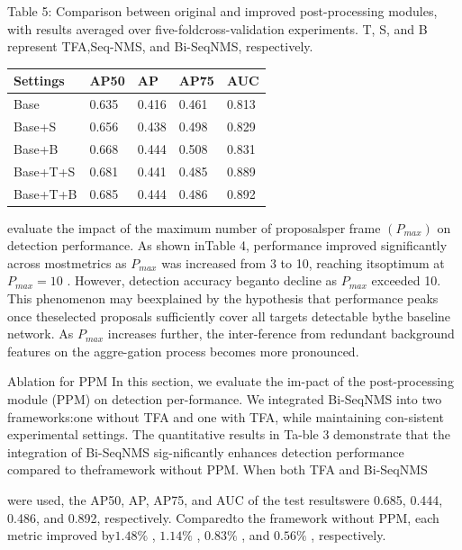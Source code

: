 \documentclass[
  10
]{article}
\newcounter{none} %
\begin{document}
Table 5: Comparison between original and improved post-processing
modules, with results averaged over five-foldcross-validation
experiments. T, S, and B represent TFA,Seq-NMS, and Bi-SeqNMS,
respectively.

{\def\LTcaptype{none} %
\begin{longtable}[]{@{}|l|l|l|l|l|@{}}
\toprule\noalign{}
\endhead
\bottomrule\noalign{}
\endlastfoot
\hline
Settings & AP50 & AP & AP75 & AUC \\
\hline
Base & 0.635 & 0.416 & 0.461 & 0.813 \\
\hline
Base+S & 0.656 & 0.438 & 0.498 & 0.829 \\
\hline
Base+B & 0.668 & 0.444 & 0.508 & 0.831 \\
\hline
Base+T+S & 0.681 & 0.441 & 0.485 & 0.889 \\
\hline
Base+T+B & 0.685 & 0.444 & 0.486 & 0.892 \\
\hline
\end{longtable}
}

evaluate the impact of the maximum number of proposalsper frame
\(( P _ { m a x } )\) on detection performance. As shown inTable 4,
performance improved significantly across mostmetrics as
\(P _ { m a x }\) was increased from 3 to 10, reaching itsoptimum at
\(P _ { m a x } = 1 0\) . However, detection accuracy beganto decline as
\(P _ { m a x }\) exceeded 10. This phenomenon may beexplained by the
hypothesis that performance peaks once theselected proposals
sufficiently cover all targets detectable bythe baseline network. As
\(P _ { m a x }\) increases further, the inter-ference from redundant
background features on the aggre-gation process becomes more pronounced.

Ablation for PPM In this section, we evaluate the im-pact of the
post-processing module (PPM) on detection per-formance. We integrated
Bi-SeqNMS into two frameworks:one without TFA and one with TFA, while
maintaining con-sistent experimental settings. The quantitative results
in Ta-ble 3 demonstrate that the integration of Bi-SeqNMS sig-nificantly
enhances detection performance compared to theframework without PPM.
When both TFA and Bi-SeqNMS

were used, the AP50, AP, AP75, and AUC of the test resultswere 0.685,
0.444, 0.486, and 0.892, respectively. Comparedto the framework without
PPM, each metric improved by\(1 . 4 8 \%\) , \(1 . 1 4 \%\) ,
\(0 . 8 3 \%\) , and \(0 . 5 6 \%\) , respectively.
\end{document}
